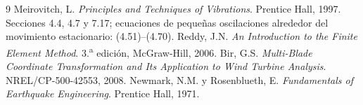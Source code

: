 \documentclass[oneside,a4paper,spanish,links,pagenumbers]{amca}
\begin{document}
\begin{thebibliography}{9}
Meirovitch, L. \emph{Principles and Techniques of Vibrations}. Prentice Hall, 1997. Secciones 4.4, 4.7 y 7.17; ecuaciones de pequeñas oscilaciones alrededor del movimiento estacionario: (4.51)--(4.70).
Reddy, J.N. \emph{An Introduction to the Finite Element Method}. 3.\textsuperscript{a} edición, McGraw-Hill, 2006.
Bir, G.S. \emph{Multi-Blade Coordinate Transformation and Its Application to Wind Turbine Analysis}. NREL/CP-500-42553, 2008.
Newmark, N.M. y Rosenblueth, E. \emph{Fundamentals of Earthquake Engineering}. Prentice Hall, 1971.
\end{thebibliography}
\end{document}
